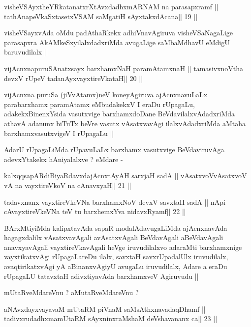 \begin{shl}
visheVSAyxtheYRkatanatxrXtAvxdadhxmARNAM na parasapxramf ||
tathA\s napeVkaSxtasetxVSAM saMgatiH sAyxtakxdAcana\hfill || 19 ||
\end{shl}

\begin{artha}
visheVSayxvAda oMdu padAthaRkekx adhiVnavAgiruva visheVSaNagaLige
parasapxra AkAMkeSxyilalxdadxriMda avugaLige saMbaMdhavU eMdigU
baruvudilalx ||
\end{artha}

\begin{shl}
vijAcnxnapuruSAnatxsayx barxhamxNaH paramAtamxnaH ||
tamasivxnoV\s tha devxV rUpeV tadanAyxvayxtireVkataH\hfill || 20 ||
\end{shl}

\begin{artha}
vijAcnxna puruSa (jiVvAtamx)neV koneyAgiruva ajAcnxnavuLaLx
parabarxhamx paramAtamx eMbudakekxV I eraDu rUpagaLu,
adakekxBinenxYsida vasutxvige barxhamxdoDane BeVdavilalxvAdadxriMda
athavA adanunx biTuTx beVre vasutx vAsatxvavAgi ilalxvAdadxriMda
aMtaha barxhamxvasutxvigeV I rUpagaLu ||

AdarU rUpagaLiMda rUpavuLaLx barxhamx vasutxvige BeVdaviruvAga
adevxYtakekx hAniyalalxve ? eMdare -
\end{artha}

\begin{shl}
kalxqqsapARdiBiyaRdavxdajAcnxtAyAH sarxjaH sadA ||
vAsatxvoV\s vAsatxvoV vA na vayxtireVkoV na cAnavxyaH\hfill || 21 ||
\end{shl}

\begin{shl}
tadavxnanx vayxtireVkeVNa barxhamxNoV devxV savxtaH sadA ||
nApi cAvayxtireVkeVNa teV tu barxhemxYva nidavxRyamf\hfill || 22 ||
\end{shl}

\begin{artha}
BArxMtiyiMda kalipxtavAda sapaR modalAdavugaLiMda ajAcnxnavAda
hagagxdalilx vAsatxvavAgali avAsatxvAgali BeVdavAgali aBeVdavAgali
anavxyavAgali vayxtireVkavAgali heVge iruvudilalxvo adaraMti
barxhamxnige vayxtikatxvAgi rUpagaLareDu ilalx, savxtaH savxrUpadalUlx
iruvudilalx, avaqtirikatxvAgi yA aBinanxvAgiyU avugaLu iruvudilalx,
Adare a eraDu rUpagaLU tatavxtaH adivxtiyavAda barxhamxveV Agiruvudu
||

mUtaRveMdareVnu ? aMutaRveMdareVnu ?
\end{artha}

\begin{shl}
aNAvxdayxvayavaM mUtaRM piVnaM saMsAthxnavadaqDhamf ||
tadivxrudadhxmamUtaRM sAyxninxraMshaM deVshavananx ca\hfill || 23 ||
\end{shl}

